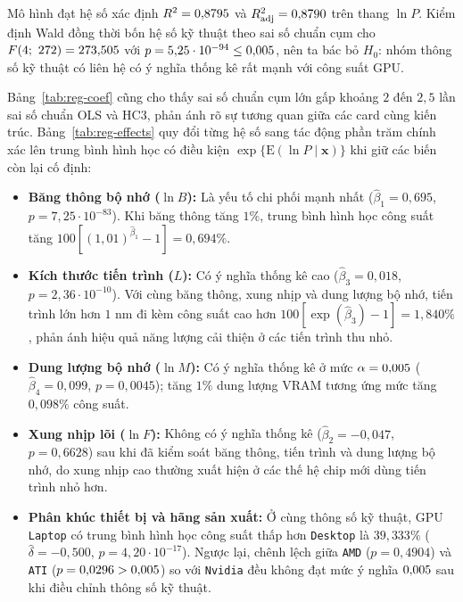 Mô hình đạt hệ số xác định $R^2 = 0{,}8795$ và $R^2_{\mathrm{adj}} = 0{,}8790$ trên
thang $\ln P$. Kiểm định Wald đồng thời bốn hệ số kỹ thuật theo sai số chuẩn cụm cho
$F(4;\ 272) = 273{,}505$ với $p = 5{,}25 \cdot 10^{-94} \le 0{,}005$,
nên ta bác bỏ $H_0$: nhóm thông số kỹ thuật có liên hệ có ý nghĩa thống kê rất mạnh với công
suất GPU.

Bảng~\ref{tab:reg-coef} cũng cho thấy sai số chuẩn cụm lớn gấp khoảng $2$ đến $2{,}5$ lần sai
số chuẩn OLS và HC3, phản ánh rõ sự tương quan giữa các card cùng kiến trúc. Bảng~\ref{tab:reg-effects}
quy đổi từng hệ số sang tác động phần trăm chính xác lên trung bình hình học có điều kiện
$\exp\{\mathrm{E}(\ln P \mid \mathbf{x})\}$ khi giữ các biến còn lại cố định:
\begin{itemize}
  \item \textbf{Băng thông bộ nhớ ($\ln B$):} Là yếu tố chi phối mạnh nhất ($\hat{\beta}_1 = 0{,}695$,
    $p = 7{,}25 \cdot 10^{-83}$). Khi băng thông tăng $1\%$, trung bình hình học công suất tăng
    $100[(1{,}01)^{\hat{\beta}_1} - 1] = 0{,}694\%$.
  \item \textbf{Kích thước tiến trình ($L$):} Có ý nghĩa thống kê cao ($\hat{\beta}_3 = 0{,}018$,
    $p = 2{,}36 \cdot 10^{-10}$). Với cùng băng thông, xung nhịp và dung lượng bộ nhớ, tiến trình
    lớn hơn $1\text{ nm}$ đi kèm công suất cao hơn $100[\exp(\hat{\beta}_3) - 1] = 1{,}840\%$, phản
    ánh hiệu quả năng lượng cải thiện ở các tiến trình thu nhỏ.
  \item \textbf{Dung lượng bộ nhớ ($\ln M$):} Có ý nghĩa thống kê ở mức $\alpha = 0{,}005$
    ($\hat{\beta}_4 = 0{,}099$, $p = 0{,}0045$); tăng $1\%$ dung lượng VRAM tương ứng mức tăng
    $0{,}098\%$ công suất.
  \item \textbf{Xung nhịp lõi ($\ln F$):} Không có ý nghĩa thống kê ($\hat{\beta}_2 = -0{,}047$,
    $p = 0{,}6628$) sau khi đã kiểm soát băng thông, tiến trình và dung lượng bộ nhớ, do xung nhịp
    cao thường xuất hiện ở các thế hệ chip mới dùng tiến trình nhỏ hơn.
  \item \textbf{Phân khúc thiết bị và hãng sản xuất:} Ở cùng thông số kỹ thuật, GPU
    \texttt{Laptop} có trung bình hình học công suất thấp hơn \texttt{Desktop} là $39{,}333\%$
    ($\hat{\delta} = -0{,}500$, $p = 4{,}20 \cdot 10^{-17}$). Ngược lại, chênh lệch giữa
    \texttt{AMD} ($p = 0{,}4904$) và \texttt{ATI} ($p = 0{,}0296 > 0{,}005$) so với
    \texttt{Nvidia} đều không đạt mức ý nghĩa $0{,}005$ sau khi điều chỉnh thông số kỹ thuật.
\end{itemize}

